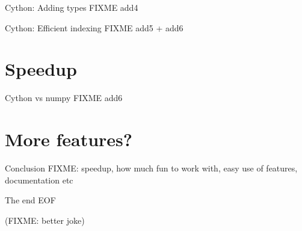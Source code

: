 \documentclass[dvipsnames]{beamer}
\begin{document}
\begin{frame}{Cython: Adding types}
FIXME add4
\end{frame}

\begin{frame}{Cython: Efficient indexing}
FIXME add5 + add6
\end{frame}

\section{Speedup}

\begin{frame}{Cython vs numpy}
FIXME add6
\end{frame}

\section{More features?}

\begin{frame}{Conclusion}
FIXME: speedup, how much fun to work with, easy use of features, documentation etc
\end{frame}

\begin{frame}{The end}
EOF

(FIXME: better joke)
\end{frame}
\end{document}

